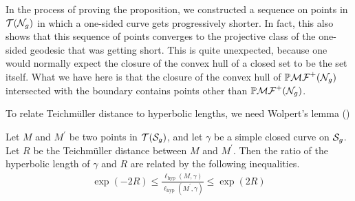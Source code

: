 \documentclass[12pt, reqno]{amsart}
\begin{document}
\begin{remark}
  In the process of proving the proposition, we constructed a sequence on points in $\mathcal{T}(\mathcal{N}_g)$ in which a one-sided curve gets progressively shorter.
  In fact, this also shows that this sequence of points converges to the projective class of the one-sided geodesic that was getting short.
  This is quite unexpected, because one would normally expect the closure of the convex hull of a closed set to be the set itself.
  What we have here is that the closure of the convex hull of $\mathbb{P}\mathcal{MF}^+(\mathcal{N}_g)$ intersected with the boundary contains points other than $\mathbb{P}\mathcal{MF}^+(\mathcal{N}_g)$.
\end{remark}

To relate Teichm\"uller distance to hyperbolic lengths, we need Wolpert's lemma (\autocite{wolpert1979length})
\begin{lemma}
  Let $M$ and $M^{\prime}$ be two points in $\mathcal{T}(\mathcal{S}_g)$, and let $\gamma$ be a simple closed curve on $\mathcal{S}_g$.
  Let $R$ be the Teichm\"uller distance between $M$ and $M^{\prime}$. Then the ratio of the hyperbolic length
  of $\gamma$ and $R$ are related by the following inequalities.
  \begin{align*}
    \exp(-2R) \leq \frac{\ell_{\mathrm{hyp}}(M, \gamma)}{\ell_{\mathrm{hyp}}(M^{\prime}, \gamma)} \leq \exp(2R)
  \end{align*}
\end{lemma}
\end{document}
